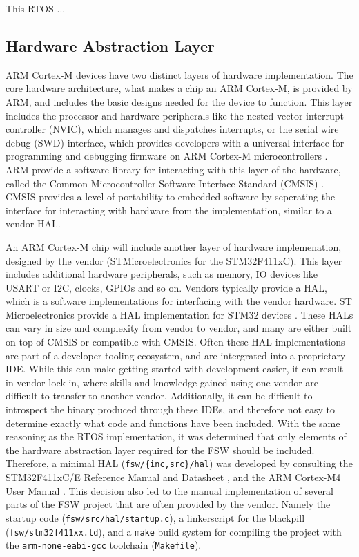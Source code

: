 \documentclass[../report.tex]{subfiles}
\begin{document}
This RTOS ... %

\subsection{Hardware Abstraction Layer}

ARM Cortex-M devices have two distinct layers of hardware implementation. The
core hardware architecture, what makes a chip an ARM Cortex-M, is provided by
ARM, and includes the basic designs needed for the device to function. This
layer includes the processor and hardware peripherals like the nested vector
interrupt controller (NVIC), which manages and dispatches interrupts, or the
serial wire debug (SWD) interface, which provides developers with a universal
interface for programming and debugging firmware on ARM Cortex-M
microcontrollers \citep{armcm4_manual}. ARM provide a software library for
interacting with this layer of the hardware, called the Common Microcontroller
Software Interface Standard (CMSIS) \citep{CMSIS}. CMSIS provides a level of portability to
embedded software by seperating the interface for interacting with hardware
from the implementation, similar to a vendor HAL.

An ARM Cortex-M chip will include another layer of hardware implemenation,
designed by the vendor (STMicroelectronics for the STM32F411xC). This
layer includes additional hardware peripherals, such as memory, IO devices like
USART or I2C, clocks, GPIOs and so on. Vendors typically provide a HAL, which
is a software implementations for interfacing with the vendor hardware. ST
Microelectronics provide a HAL implementation for STM32 devices
\citep{stm32hal}. These HALs can vary in size and complexity from vendor to
vendor, and many are either built on top of CMSIS or compatible with CMSIS.
Often these HAL implementations are part of a developer tooling ecosystem, and
are intergrated into a proprietary IDE. While this can make getting started
with development easier, it can result in vendor lock in, where skills and
knowledge gained using one vendor are difficult to transfer to another vendor.
Additionally, it can be difficult to introspect the binary produced through
these IDEs, and therefore not easy to determine exactly what code and functions
have been included. With the same reasoning as the RTOS implementation, it was
determined that only elements of the hardware abstraction layer required for
the FSW should be included. Therefore, a minimal HAL
(\lstinline|fsw/{inc,src}/hal|) was developed by consulting the STM32F411xC/E
Reference Manual and Datasheet \citep{stm32f4_manual, stm32f4_datasheet}, and
the ARM Cortex-M4 User Manual \citep{armcm4_manual}. This decision also led to
the manual implementation of several parts of the FSW project that are often
provided by the vendor. Namely the startup code
(\lstinline|fsw/src/hal/startup.c|), a linkerscript for the blackpill
(\lstinline|fsw/stm32f411xx.ld|), and a \lstinline|make| build system for
compiling the project with the \lstinline|arm-none-eabi-gcc| toolchain
(\lstinline|Makefile|).
\end{document}

